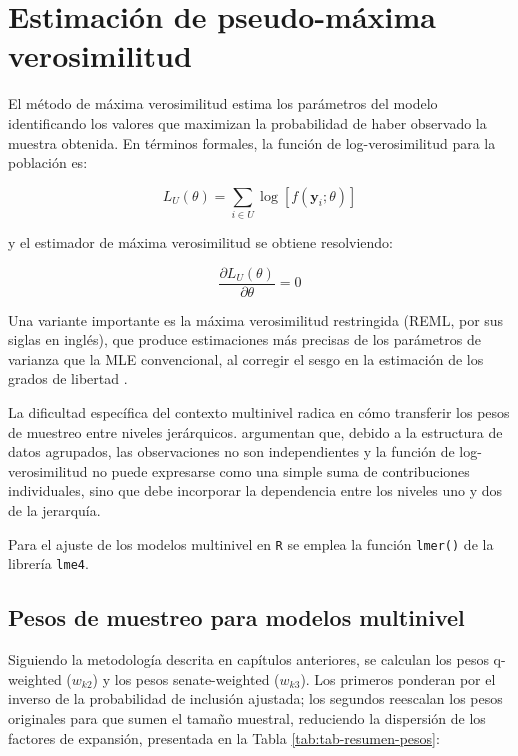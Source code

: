 \documentclass[
  spanish,
  12pt,
]{book}
\begin{document}
\section{Estimación de pseudo-máxima verosimilitud}\label{sec-mpv-multinivel}

El método de máxima verosimilitud estima los parámetros del modelo identificando los valores que maximizan la probabilidad de haber observado la muestra obtenida. En términos formales, la función de log-verosimilitud para la población es:

\[
L_{U}(\theta) = \sum_{i \in U} \log\left[f\left(\boldsymbol{y}_{i}; \theta\right)\right]
\]

y el estimador de máxima verosimilitud se obtiene resolviendo:

\[
\frac{\partial L_{U}(\theta)}{\partial \theta} = 0
\]

Una variante importante es la máxima verosimilitud restringida (REML, por sus siglas en inglés), que produce estimaciones más precisas de los parámetros de varianza que la MLE convencional, al corregir el sesgo en la estimación de los grados de libertad \citep{kreft1998introducing}.

La dificultad específica del contexto multinivel radica en cómo transferir los pesos de muestreo entre niveles jerárquicos. \citet{pfeffermann1998weighting} argumentan que, debido a la estructura de datos agrupados, las observaciones no son independientes y la función de log-verosimilitud no puede expresarse como una simple suma de contribuciones individuales, sino que debe incorporar la dependencia entre los niveles uno y dos de la jerarquía.

Para el ajuste de los modelos multinivel en \texttt{R} se emplea la función \texttt{lmer()} de la librería \texttt{lme4}.

\subsection{Pesos de muestreo para modelos multinivel}\label{pesos-de-muestreo-para-modelos-multinivel}

Siguiendo la metodología descrita en capítulos anteriores, se calculan los pesos q-weighted (\(w_{k2}\)) y los pesos senate-weighted (\(w_{k3}\)). Los primeros ponderan por el inverso de la probabilidad de inclusión ajustada; los segundos reescalan los pesos originales para que sumen el tamaño muestral, reduciendo la dispersión de los factores de expansión, presentada en la Tabla \ref{tab:tab-resumen-pesos}:
\end{document}
